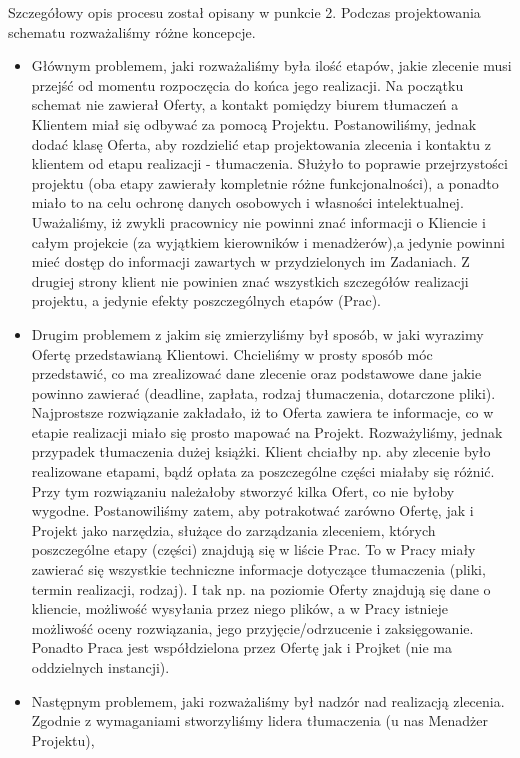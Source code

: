 \documentclass[licencjacka]{pracamgr}
\begin{document}
Szczegółowy opis procesu został opisany w punkcie 2. Podczas projektowania schematu rozważaliśmy różne koncepcje.
\begin{itemize}
\item Głównym problemem, jaki rozważaliśmy była ilość etapów, jakie zlecenie musi przejść od momentu rozpoczęcia do końca jego realizacji. 
Na początku schemat nie zawierał Oferty, a kontakt pomiędzy biurem tłumaczeń a Klientem miał się odbywać za pomocą Projektu. 
Postanowiliśmy, jednak dodać klasę Oferta, aby rozdzielić etap projektowania zlecenia i kontaktu z klientem od etapu realizacji - tłumaczenia. 
Służyło to poprawie przejrzystości projektu (oba etapy zawierały kompletnie różne funkcjonalności), a ponadto miało to na celu ochronę danych osobowych i własności intelektualnej.
Uważaliśmy, iż zwykli pracownicy nie powinni znać informacji o Kliencie i całym projekcie (za wyjątkiem kierowników i menadżerów),a jedynie powinni mieć dostęp do informacji zawartych w przydzielonych im Zadaniach.
 Z drugiej strony klient nie powinien znać wszystkich szczegółów realizacji projektu, a jedynie efekty poszczególnych etapów (Prac).
\item Drugim problemem z jakim się zmierzyliśmy był sposób, w jaki wyrazimy Ofertę przedstawianą Klientowi.
Chcieliśmy w prosty sposób móc przedstawić, co ma zrealizować dane zlecenie oraz podstawowe dane jakie powinno zawierać (deadline, zapłata, rodzaj tłumaczenia, dotarczone pliki).
Najprostsze rozwiązanie zakładało, iż to Oferta zawiera te informacje, co w etapie realizacji miało się prosto mapować na Projekt.
Rozważyliśmy, jednak przypadek tłumaczenia dużej książki. Klient chciałby np. aby zlecenie było realizowane etapami, bądź opłata za poszczególne części miałaby się różnić.
Przy tym rozwiązaniu należałoby stworzyć kilka Ofert, co nie byłoby wygodne. 
Postanowiliśmy zatem, aby potrakotwać zarówno Ofertę, jak i Projekt jako narzędzia, służące do zarządzania zleceniem, których poszczególne etapy (części) znajdują się w liście Prac.
To w Pracy miały zawierać się wszystkie techniczne informacje dotyczące tłumaczenia (pliki, termin realizacji, rodzaj). I tak np. na poziomie Oferty  znajdują się dane o kliencie,
możliwość wysyłania przez niego plików, a w Pracy istnieje możliwość oceny rozwiązania, jego przyjęcie/odrzucenie i zaksięgowanie.
Ponadto Praca jest współdzielona przez Ofertę jak i Projket (nie ma oddzielnych instancji).
\item Następnym problemem, jaki rozważaliśmy był nadzór nad realizacją zlecenia. Zgodnie z wymaganiami stworzyliśmy lidera tłumaczenia (u nas Menadżer Projektu), 

\end{itemize}
\end{document}
